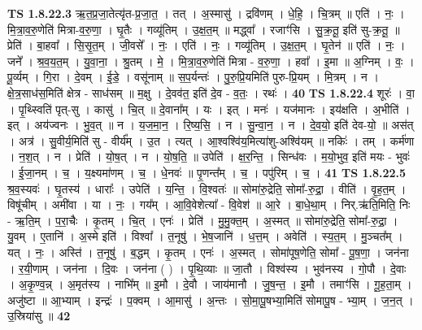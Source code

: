 \documentclass[17pt]{extarticle}
\begin{document}
                  \newline
                                \textbf{ TS 1.8.22.3} \newline
                  ऋ॒त॒प्र॒जा॒तेत्यृ॑त-प्र॒जा॒त॒ । तत् । अ॒स्मासु॑ । द्रवि॑णम् । धे॒हि॒ । चि॒त्रम् ॥ एति॑ । नः॒ । मि॒त्रा॒व॒रु॒णेति॑ मित्रा-व॒रु॒णा॒ । घृ॒तैः । गव्यू॑तिम् । उ॒क्ष॒त॒म् ॥ मद्ध्वा᳚ । रजाꣳ॑सि । सु॒क्र॒तू॒ इति॑ सु-क्र॒तू॒ ॥ प्रेति॑ । बा॒हवा᳚ । सि॒सृ॒त॒म् । जी॒वसे᳚ । नः॒ । एति॑ । नः॒ । गव्यू॑तिम् । उ॒क्ष॒त॒म् । घृ॒तेन॑ ॥ एति॑ । नः॒ । जने᳚ । श्र॒व॒य॒त॒म् । यु॒वा॒ना॒ । श्रु॒तम् । मे॒ । मि॒त्रा॒व॒रु॒णेति॑ मित्रा - व॒रु॒णा॒ । हवा᳚ । इ॒मा ॥ अ॒ग्निम् । वः॒ । पू॒र्व्यम् । गि॒रा । दे॒वम् । ई॒डे॒ । वसू॑नाम् ॥ स॒प॒र्यन्तः॑ । पु॒रु॒प्रि॒यमिति॑ पुरु-प्रि॒यम् । मि॒त्रम् । न । क्षे॒त्र॒साध॑स॒मिति॑ क्षेत्र - साध॑सम् ॥ म॒क्षु । दे॒वव॑त॒ इति॑ दे॒व - व॒तः॒ । रथः॑ । \textbf{  40} \newline
                  \newline
                                \textbf{ TS 1.8.22.4} \newline
                  शूरः॑ । वा॒ । पृ॒थ्स्विति॑ पृत्-सु । कासु॑ । चि॒त् ॥ दे॒वाना᳚म् । यः । इत् । मनः॑ । यज॑मानः । इय॑क्षति । अ॒भीति॑ । इत् । अय॑ज्वनः । भु॒व॒त् ॥ न । य॒ज॒मा॒न॒ । रि॒ष्य॒सि॒ । न । सु॒न्वा॒न॒ । न । दे॒व॒यो॒ इति॑ देव-यो॒ ॥ अस॑त् । अत्र॑ । सु॒वीर्य॒मिति॑ सु - वीर्य᳚म् । उ॒त । त्यत् । आ॒श्वश्वि॑य॒मित्या॑शु-अश्वि॑यम् ॥ नकिः॑ । तम् । कर्म॑णा । न॒श॒त् । न । प्रेति॑ । यो॒ष॒त् । न । यो॒ष॒ति॒ ॥ उपेति॑ । क्ष॒र॒न्ति॒ । सिन्ध॑वः । म॒यो॒भुव॒ इति॑ मयः - भुवः॑ । ई॒जा॒नम् । च॒ । य॒क्ष्यमा॑णम् । च॒ । धे॒नवः॑ ॥ पृ॒णन्त᳚म् । च॒ । पपु॑रिम् । च॒ । \textbf{  41} \newline
                  \newline
                                \textbf{ TS 1.8.22.5} \newline
                  श्र॒व॒स्यवः॑ । घृ॒तस्य॑ । धाराः᳚ । उपेति॑ । य॒न्ति॒ । वि॒श्वतः॑ ॥ सोमा॑रु॒द्रेति॒ सोमा᳚-रु॒द्रा॒ । वीति॑ । वृ॒ह॒त॒म् । विषू॑चीम् । अमी॑वा । या । नः॒ । गय᳚म् । आ॒वि॒वेशेत्या᳚ - वि॒वेश॑ ॥ आ॒रे । बा॒धे॒था॒म् । निर्.ऋ॑ति॒मिति॒ निः - ऋ॒ति॒म् । प॒रा॒चैः । कृ॒तम् । चि॒त् । एनः॑ । प्रेति॑ । मु॒मु॒क्त॒म् । अ॒स्मत् ॥ सोमा॑रु॒द्रेति॒ सोमा᳚-रु॒द्रा॒ । यु॒वम् । ए॒तानि॑ । अ॒स्मे इति॑ । विश्वा᳚ । त॒नूषु॑ । भे॒ष॒जानि॑ । ध॒त्त॒म् । अवेति॑ । स्य॒त॒म् । मु॒ञ्चत᳚म् । यत् । नः॒ । अस्ति॑ । त॒नूषु॑ । ब॒द्धम् । कृ॒तम् । एनः॑ । अ॒स्मत् । सोमा॑पूष॒णेति॒ सोमा᳚ - पू॒ष॒णा॒ । जन॑ना । र॒यी॒णाम् । जन॑ना । दि॒वः । जन॑ना ( ) । पृ॒थि॒व्याः ॥ जा॒तौ । विश्व॑स्य । भुव॑नस्य । गो॒पौ । दे॒वाः । अ॒कृ॒ण्व॒न्न् । अ॒मृत॑स्य । नाभि᳚म् ॥ इ॒मौ । दे॒वौ । जाय॑मानौ । जु॒ष॒न्त॒ । इ॒मौ । तमाꣳ॑सि । गू॒ह॒ता॒म् । अजु॑ष्टा ॥ आ॒भ्याम् । इन्द्रः॑ । प॒क्वम् । आ॒मासु॑ । अ॒न्तः । सो॒मा॒पू॒षभ्या॒मिति॑ सोमापू॒ष - भ्या॒म् । ज॒न॒त् । उ॒स्रिया॑सु ॥ \textbf{  42} \newline
\end{document}
